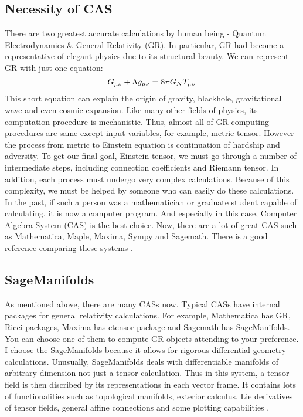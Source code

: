 \documentclass[%
 reprint,
 amsmath,amssymb,
 aps,
]{revtex4-1}
\begin{document}
\subsection{Necessity of CAS}
There are two greatest accurate calculations by human being - Quantum
Electrodynamics \& General Relativity (GR). In particular, GR had become a
representative of elegant physics due to its structural beauty.
We can represent GR with just one equation:
\begin{equation}
  \tensor{G}{_\mu_\nu} + \Lambda g_{\mu\nu}= 8\pi G_N \tensor{T}{_\mu_\nu}
\end{equation}
This short equation can explain the origin of gravity, blackhole, gravitational
wave and even cosmic expansion.
Like many other fields of physics, its computation procedure is mechanistic.
Thus, almost all of GR computing procedures are same except input variables, for
example, metric tensor. However the process from metric to Einstein equation is
continuation of hardship and adversity. To get our final goal, Einstein tensor,
we must go through a number of intermediate steps, including connection
coefficients and Riemann tensor. In addition, each process must undergo very
complex calculations. Because of this complexity, we must be helped by someone
who can easily do these calculations. In the past, if such a person was a
mathematician or graduate student capable of calculating, it is now a computer
program. And especially in this case, Computer Algebra System (CAS) is the best
choice. Now, there are a lot of great CAS such as Mathematica, Maple, Maxima,
Sympy and Sagemath. There is a good reference comparing these systems
\cite{symbol}.

\subsection{SageManifolds}

As mentioned above, there are many CASs now. Typical CASs have internal packages
for general relativity calculations. For example, Mathematica has GR, Ricci
packages, Maxima has ctensor package and Sagemath has SageManifolds. You can
choose one of them to compute GR objects attending to your preference.  I choose
the SageManifolds because it allows for
rigorous differential geometry calculations. Unusually, SageManifolds deals with
differentiable manifolds of arbitrary dimension not just a tensor calculation.
Thus in this system, a tensor field is then discribed by its representations in
each vector frame. It contains lots of functionalities such as topological
manifolds, exterior calculus, Lie derivatives of tensor fields, general affine
connections and some plotting capabilities \cite{sage}. 
\end{document}
